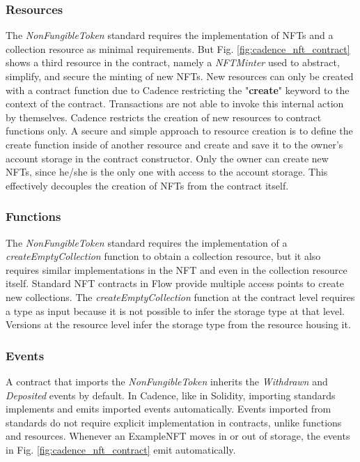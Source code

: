 \documentclass[../NFTComp_IEEE.tex]{subfiles}
\begin{document}
\subsubsection{Resources}
The \textit{NonFungibleToken} standard requires the implementation of NFTs and a collection resource as minimal requirements. But Fig. \ref{fig:cadence_nft_contract} shows a third resource in the contract, namely a \textit{NFTMinter} used to abstract, simplify, and secure the minting of new NFTs. New resources can only be created with a contract function due to Cadence restricting the "\textbf{create}" keyword to the context of the contract. Transactions are not able to invoke this internal action by themselves. Cadence restricts the creation of new resources to contract functions only. A secure and simple approach to resource creation is to define the create function inside of another resource and create and save it to the owner's account storage in the contract constructor. Only the owner can create new NFTs, since he/she is the only one with access to the account storage. This effectively decouples the creation of NFTs from the contract itself.

\subsubsection{Functions}
The \textit{NonFungibleToken} standard requires the implementation of a \textit{createEmptyCollection} function to obtain a collection resource, but it also requires similar implementations in the NFT and even in the collection resource itself. Standard NFT contracts in Flow provide multiple access points to create new collections. The \textit{createEmptyCollection} function at the contract level requires a type as input because it is not possible to infer the storage type at that level. Versions at the resource level infer the storage type from the resource housing it.

\subsubsection{Events}
A contract that imports the \textit{NonFungibleToken} inherits the \textit{Withdrawn} and \textit{Deposited} events by default. In Cadence, like in Solidity, importing standards implements and emits imported events automatically. Events imported from standards do not require explicit implementation in contracts, unlike functions and resources. Whenever an ExampleNFT moves in or out of storage, the events in Fig. \ref{fig:cadence_nft_contract} emit automatically.
\end{document}
